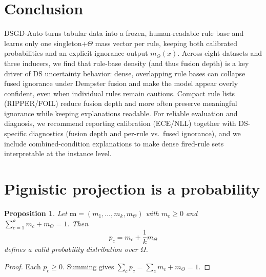 \documentclass[11pt,a4paper]{article}
\providecommand{\mb}[1]{#1}
\renewcommand{\mb}[1]{\bm{#1}}
\providecommand{\1}{}
\renewcommand{\1}{\mathbbm{1}}
\newtheorem{prop}{Proposition}
\begin{document}
\section{Conclusion}
DSGD-Auto turns tabular data into a frozen, human-readable rule base and learns only one singleton+$\Theta$ mass vector per rule, keeping both calibrated probabilities and an explicit ignorance output $m_\Theta(x)$.
Across eight datasets and three inducers, we find that rule-base density (and thus fusion depth) is a key driver of DS uncertainty behavior: dense, overlapping rule bases can collapse fused ignorance under Dempster fusion and make the model appear overly confident, even when individual rules remain cautious.
Compact rule lists (RIPPER/FOIL) reduce fusion depth and more often preserve meaningful ignorance while keeping explanations readable.
For reliable evaluation and diagnosis, we recommend reporting calibration (ECE/NLL) together with DS-specific diagnostics (fusion depth and per-rule vs.\ fused ignorance), and we include combined-condition explanations to make dense fired-rule sets interpretable at the instance level.

\appendix
\section{Pignistic projection is a probability}
\begin{prop}
Let $\mb{m}=(m_1,\dots,m_k,m_\Theta)$ with $m_c\ge 0$ and $\sum_{c=1}^k m_c+m_\Theta=1$.
Then
\[
p_c = m_c + \frac{1}{k}m_\Theta
\]
defines a valid probability distribution over $\Omega$.
\end{prop}

\begin{proof}
Each $p_c\ge 0$. Summing gives $\sum_c p_c=\sum_c m_c + m_\Theta=1$.
\end{proof}
\end{document}
